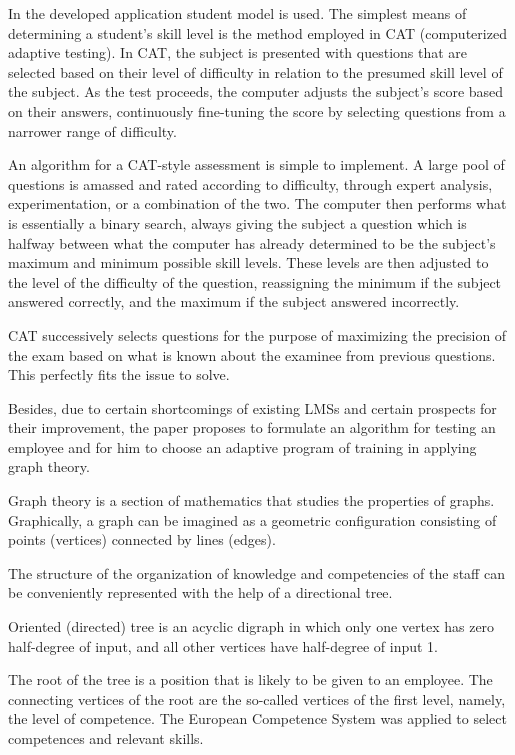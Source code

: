 \documentclass[a4paper,14pt,oneside,final]{extarticle}
\begin{document}
In the developed application student model is used. The simplest means of determining a student's skill level is the method employed in CAT (computerized adaptive testing). In CAT, the subject is presented with questions that are selected based on their level of difficulty in relation to the presumed skill level of the subject. As the test proceeds, the computer adjusts the subject's score based on their answers, continuously fine-tuning the score by selecting questions from a narrower range of difficulty.

An algorithm for a CAT-style assessment is simple to implement. A large pool of questions is amassed and rated according to difficulty, through expert analysis, experimentation, or a combination of the two. The computer then performs what is essentially a binary search, always giving the subject a question which is halfway between what the computer has already determined to be the subject's maximum and minimum possible skill levels. These levels are then adjusted to the level of the difficulty of the question, reassigning the minimum if the subject answered correctly, and the maximum if the subject answered incorrectly.

CAT successively selects questions for the purpose of maximizing the precision of the exam based on what is known about the examinee from previous questions. This perfectly fits the issue to solve. 

Besides, due to certain shortcomings of existing LMSs and certain prospects for their improvement, the paper proposes to formulate an algorithm for testing an employee and for him to choose an adaptive program of training in applying graph theory.

Graph theory is a section of mathematics that studies the properties of graphs. Graphically, a graph can be imagined as a geometric configuration consisting of points (vertices) connected by lines (edges).

The structure of the organization of knowledge and competencies of the staff can be conveniently represented with the help of a directional tree.

Oriented (directed) tree is an acyclic digraph in which only one vertex has zero half-degree of input, and all other vertices have half-degree of input 1.

The root of the tree is a position that is likely to be given to an employee. The connecting vertices of the root are the so-called vertices of the first level, namely, the level of competence. The European Competence System was applied to select competences and relevant skills.
\end{document}

